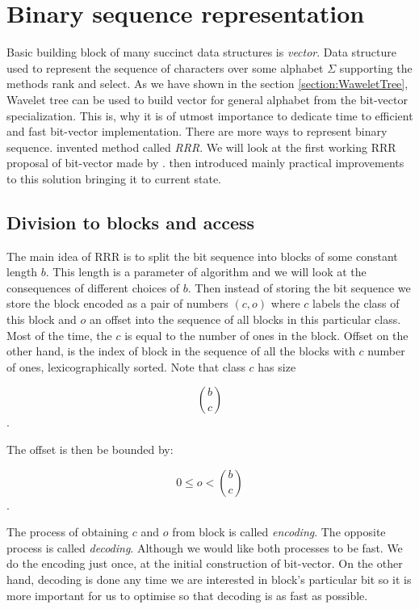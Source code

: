 \chapter{Binary sequence representation}
\label{kap:kap2}

Basic building block of many succinct data structures is \textit{vector}. Data structure
used to represent the sequence of characters over some alphabet $\Sigma$ supporting the
methods rank and select. As we
have shown in the section \ref{section:WaweletTree}, Wavelet tree can be used to
build vector for general alphabet from the bit-vector specialization. This is, why
it is of utmost importance to dedicate time to efficient and fast bit-vector
implementation. There are more ways to represent binary sequence. \cite{raman2007succinct}
invented method called \textit{RRR}. We will look at the first working RRR proposal
of bit-vector made by \cite{claude2008practical}. \cite{navarro2012fast} then introduced
mainly practical improvements to this solution bringing it to current state.

\section{Division to blocks and access}

The main idea of RRR is to split the bit sequence into blocks of some constant
length $b$. This length is a parameter of algorithm and we will look at the consequences
of different choices of $b$. Then instead of storing the bit sequence we store the
block encoded as a pair of numbers $(c, o)$ where $c$ labels the class of this
block and $o$ an offset into the sequence of all blocks in this particular class.
Most of the time, the $c$ is equal to the number of ones in the block. Offset on
the other hand, is the index of block in the sequence of all the blocks with $c$ number
of ones, lexicographically sorted. Note that class $c$ has size

                $${b\choose c}$$.

The offset is then be bounded by:

				$$0 \leq o < {b\choose c}$$.

The process of obtaining $c$ and $o$ from block is called \textit{encoding}.
The opposite process is called \textit{decoding}. Although we would like both
processes to be fast. We do the encoding just once, at the initial construction
of bit-vector. On the other hand, decoding is done any time we are interested in
block's particular bit so it is more important for us to optimise so that decoding
is as fast as possible.

